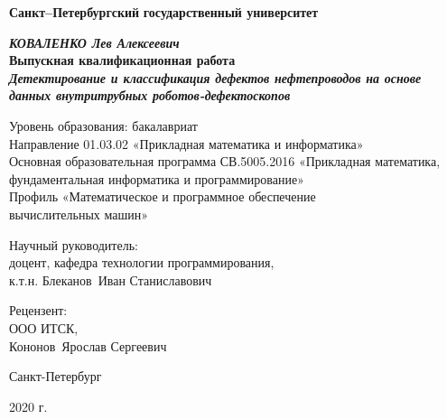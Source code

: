 
\begin{titlepage}
\begin{center}
\textbf{Санкт--Петербургский}
\textbf{государственный университет}

\vspace{35mm}

\textbf{\textit{\large КОВАЛЕНКО Лев Алексеевич}} \\[8mm]
\textbf{\large Выпускная квалификационная работа}\\[3mm]
\textbf{\textit{\large Детектирование и классификация дефектов 
нефтепроводов на основе данных 
внутритрубных роботов-дефектоскопов}}

\vspace{20mm}
Уровень образования: бакалавриат\\
Направление 01.03.02 «Прикладная математика и информатика»\\
Основная образовательная программа СВ.5005.2016
«Прикладная математика, фундаментальная информатика и программирование»\\
Профиль «Математическое и программное обеспечение \\ вычислительных машин»\\[30mm]


\begin{flushright}
{Научный руководитель:} \\
доцент, кафедра технологии программирования, \\ к.т.н.  Блеканов~Иван Станиславович
\end{flushright}
\begin{flushright}
{Рецензент:} \\
ООО ИТСК, \\  Кононов~Ярослав Сергеевич
\end{flushright}

\vfill 

{Санкт-Петербург}
\par{2020 г.}
\end{center}
\end{titlepage}
\restoregeometry
\addtocounter{page}{1}